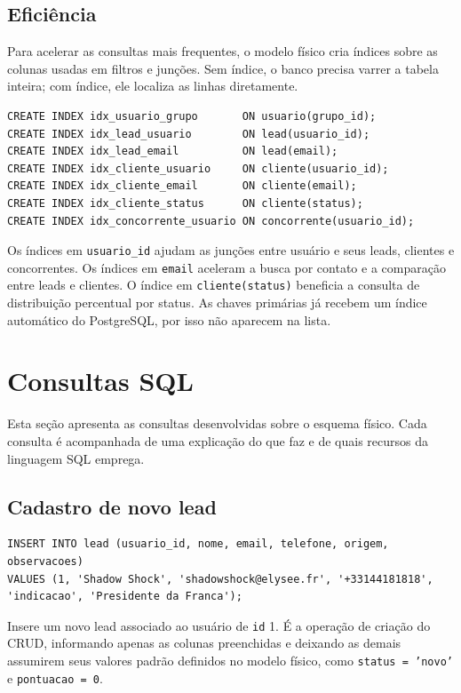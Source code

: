 \documentclass[a4paper]{article}
\begin{document}
\subsection{Eficiência}

Para acelerar as consultas mais frequentes, o modelo físico cria índices sobre as colunas
usadas em filtros e junções. Sem índice, o banco precisa varrer a tabela inteira; com
índice, ele localiza as linhas diretamente.

\begin{verbatim}
CREATE INDEX idx_usuario_grupo       ON usuario(grupo_id);
CREATE INDEX idx_lead_usuario        ON lead(usuario_id);
CREATE INDEX idx_lead_email          ON lead(email);
CREATE INDEX idx_cliente_usuario     ON cliente(usuario_id);
CREATE INDEX idx_cliente_email       ON cliente(email);
CREATE INDEX idx_cliente_status      ON cliente(status);
CREATE INDEX idx_concorrente_usuario ON concorrente(usuario_id);
\end{verbatim}

Os índices em \texttt{usuario\_id} ajudam as junções entre usuário e seus leads, clientes e
concorrentes. Os índices em \texttt{email} aceleram a busca por contato e a comparação
entre leads e clientes. O índice em \texttt{cliente(status)} beneficia a consulta de
distribuição percentual por status. As chaves primárias já recebem um índice automático do
PostgreSQL, por isso não aparecem na lista.

\section{Consultas SQL}

Esta seção apresenta as consultas desenvolvidas sobre o esquema físico. Cada consulta é
acompanhada de uma explicação do que faz e de quais recursos da linguagem SQL emprega.

\subsection{Cadastro de novo lead}

\begin{verbatim}
INSERT INTO lead (usuario_id, nome, email, telefone, origem, observacoes)
VALUES (1, 'Shadow Shock', 'shadowshock@elysee.fr', '+33144181818', 'indicacao', 'Presidente da Franca');
\end{verbatim}

Insere um novo lead associado ao usuário de \texttt{id} 1. É a operação de criação do
CRUD, informando apenas as colunas preenchidas e deixando as demais assumirem seus valores
padrão definidos no modelo físico, como \texttt{status = 'novo'} e \texttt{pontuacao = 0}.
\end{document}
